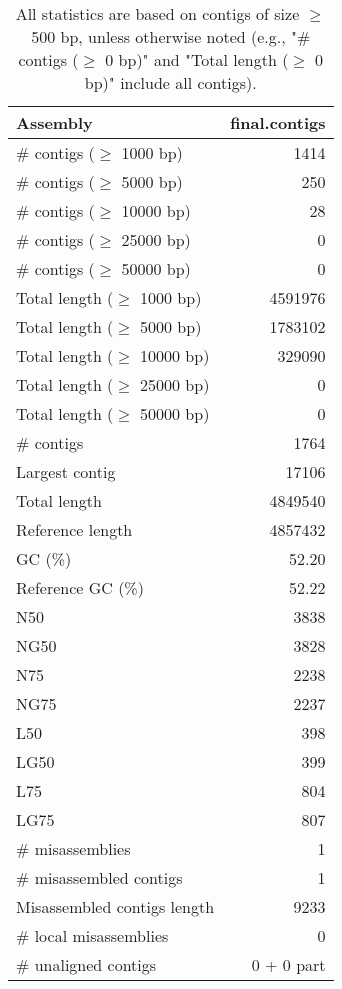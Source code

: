 \documentclass[12pt,a4paper]{article}
\begin{document}
\begin{table}[ht]
\begin{center}
\caption{All statistics are based on contigs of size $\geq$ 500 bp, unless otherwise noted (e.g., "\# contigs ($\geq$ 0 bp)" and "Total length ($\geq$ 0 bp)" include all contigs).}
\begin{tabular}{|l*{1}{|r}|}
\hline
Assembly & final.contigs \\ \hline
\# contigs ($\geq$ 1000 bp) & 1414 \\ \hline
\# contigs ($\geq$ 5000 bp) & 250 \\ \hline
\# contigs ($\geq$ 10000 bp) & 28 \\ \hline
\# contigs ($\geq$ 25000 bp) & 0 \\ \hline
\# contigs ($\geq$ 50000 bp) & 0 \\ \hline
Total length ($\geq$ 1000 bp) & 4591976 \\ \hline
Total length ($\geq$ 5000 bp) & 1783102 \\ \hline
Total length ($\geq$ 10000 bp) & 329090 \\ \hline
Total length ($\geq$ 25000 bp) & 0 \\ \hline
Total length ($\geq$ 50000 bp) & 0 \\ \hline
\# contigs & 1764 \\ \hline
Largest contig & 17106 \\ \hline
Total length & 4849540 \\ \hline
Reference length & 4857432 \\ \hline
GC (\%) & 52.20 \\ \hline
Reference GC (\%) & 52.22 \\ \hline
N50 & 3838 \\ \hline
NG50 & 3828 \\ \hline
N75 & 2238 \\ \hline
NG75 & 2237 \\ \hline
L50 & 398 \\ \hline
LG50 & 399 \\ \hline
L75 & 804 \\ \hline
LG75 & 807 \\ \hline
\# misassemblies & 1 \\ \hline
\# misassembled contigs & 1 \\ \hline
Misassembled contigs length & 9233 \\ \hline
\# local misassemblies & 0 \\ \hline
\# unaligned contigs & 0 + 0 part \\ \hline

\end{tabular}
\end{center}
\end{table}
\end{document}
